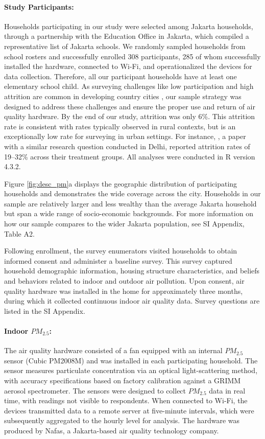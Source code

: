 \documentclass[9pt,twocolumn,twoside]{pnas-new}
\begin{document}
\paragraph{Study Participants:} Households participating in our study were selected among Jakarta households, through a partnership with the Education Office in Jakarta, which compiled a representative list of Jakarta schools. We randomly sampled households from school rosters and successfully enrolled 308 participants, 285 of whom successfully installed the hardware, connected to Wi-Fi, and operationalized the devices for data collection. Therefore, all our participant households have at least one elementary school child. As surveying challenges like low participation and high attrition are common in developing country cities \citep{greenstone_indoor_2021}, our sample strategy was designed to address these challenges and ensure the proper use and return of air quality hardware. By the end of our study, attrition was only 6\%. This attrition rate is consistent with rates typically observed in rural contexts, but is an exceptionally low rate for surveying in urban settings. For instance, \citep{greenstone_indoor_2021}, a paper with a similar research question conducted in Delhi, reported attrition rates of 19–32\% across their treatment groups. All analyses were conducted in R version 4.3.2.

Figure \ref{fig:desc_pm}a displays the geographic distribution of participating households and demonstrates the wide coverage across the city. Households in our sample are relatively larger and less wealthy than the average Jakarta household but span a wide range of socio-economic backgrounds. For more information on how our sample compares to the wider Jakarta population, see SI Appendix, Table A2.

Following enrollment, the survey enumerators visited households to obtain informed consent and administer a baseline survey. This survey captured household demographic information, housing structure characteristics, and beliefs and behaviors related to indoor and outdoor air pollution. Upon consent, air quality hardware was installed in the home for approximately three months, during which it collected continuous indoor air quality data. Survey questions are listed in the SI Appendix.

\paragraph{Indoor $PM_{2.5}$:} The air quality hardware consisted of a fan equipped with an internal $PM_{2.5}$ sensor (Cubic PM2008M) and was installed in each participating household. The sensor measures particulate concentration via an optical light-scattering method, with accuracy specifications based on factory calibration against a GRIMM aerosol spectrometer. The sensors were designed to collect $PM_{2.5}$ data in real time, with readings not visible to respondents. When connected to Wi-Fi, the devices transmitted data to a remote server at five-minute intervals, which were subsequently aggregated to the hourly level for analysis. The hardware was produced by Nafas, a Jakarta-based air quality technology company. 
\end{document}
